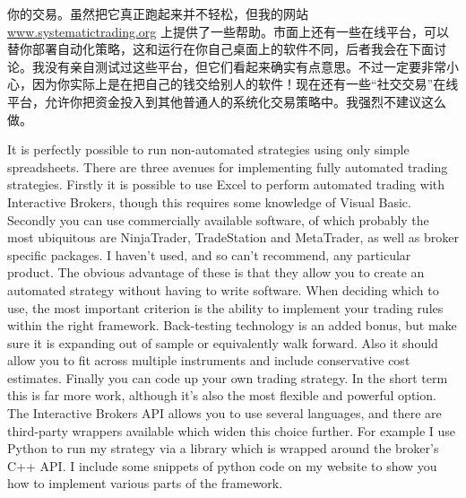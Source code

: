 \begin{chineseblock}你的交易。虽然把它真正跑起来并不轻松，但我的网站 \url{www.systematictrading.org} 上提供了一些帮助。市面上还有一些在线平台，可以替你部署自动化策略，这和运行在你自己桌面上的软件不同，后者我会在下面讨论。我没有亲自测试过这些平台，但它们看起来确实有点意思。不过一定要非常小心，因为你实际上是在把自己的钱交给别人的软件！现在还有一些“社交交易”在线平台，允许你把资金投入到其他普通人的系统化交易策略中。我强烈不建议这么做。\end{chineseblock}


\begin{englishblock} It is perfectly possible to run non-automated strategies using only simple spreadsheets. There are three avenues for implementing fully automated trading strategies. Firstly it is possible to use Excel to perform automated trading with Interactive Brokers, though this requires some knowledge of Visual Basic. Secondly you can use commercially available software, of which probably the most ubiquitous are NinjaTrader, TradeStation and MetaTrader, as well as broker specific packages. I haven't used, and so can't recommend, any particular product. The obvious advantage of these is that they allow you to create an automated strategy without having to write software. When deciding which to use, the most important criterion is the ability to implement your trading rules within the right framework. Back-testing technology is an added bonus, but make sure it is expanding out of sample or equivalently walk forward. Also it should allow you to fit across multiple instruments and include conservative cost estimates. Finally you can code up your own trading strategy. In the short term this is far more work, although it's also the most flexible and powerful option. The Interactive Brokers API allows you to use several languages, and there are third-party wrappers available which widen this choice further. For example I use Python to run my strategy via a library which is wrapped around the broker's C++ API. I include some snippets of python code on my website to show you how to implement various parts of the framework. \end{englishblock}

